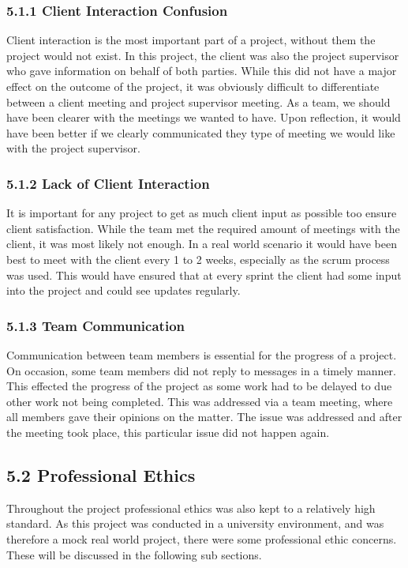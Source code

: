 \documentclass[11pt]{article}
\begin{document}
\begin{adjustwidth}{1cm}{}

\subsubsection{5.1.1 Client Interaction Confusion}
Client interaction is the most important part of a project, without them the project would not exist. In this project, the client was also the project supervisor who gave information on behalf of both parties. While this did not have a major effect on the outcome of the project, it was obviously difficult to differentiate between a client meeting and project supervisor meeting. As a team, we should have been clearer with the meetings we wanted to have. Upon reflection, it would have been better if we clearly communicated they type of meeting we would like with the project supervisor. 

\subsubsection{5.1.2 Lack of Client Interaction}
It is important for any project to get as much client input as possible too ensure client satisfaction. While the team met the required amount of meetings with the client, it was most likely not enough. In a real world scenario it would have been best to meet with the client every 1 to 2 weeks, especially as the scrum process was used. This would have ensured that at every sprint the client had some input into the project and could see updates regularly. 

\subsubsection{5.1.3 Team Communication}
Communication between team members is essential for the progress of a project. On occasion, some team members did not reply to messages in a timely manner. This effected the progress of the project as some work had to be delayed to due other work not being completed. This was addressed via a team meeting, where all members gave their opinions on the matter. The issue was addressed and after the meeting took place, this particular issue did not happen again.

\end{adjustwidth}

\subsection{5.2 Professional Ethics}
Throughout the project professional ethics was also kept to a relatively high standard. As this project was conducted in a university environment, and was therefore a mock real world project, there were some professional ethic concerns. These will be discussed in the following sub sections.
\end{document}
